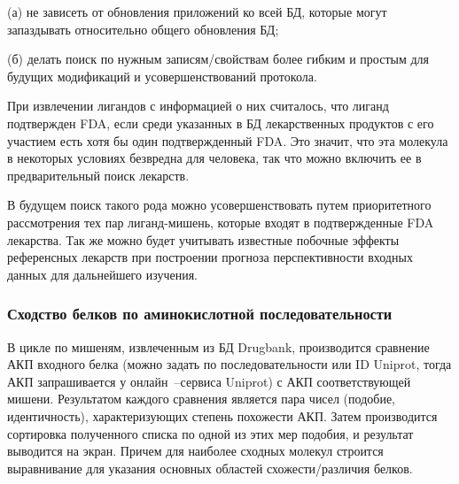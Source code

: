 \documentclass[a4paper,14pt]{article}         %
\begin{document}
(а) не зависеть от обновления приложений ко всей БД, которые могут запаздывать относительно общего обновления БД; 

(б) делать поиск по нужным записям/свойствам более гибким и простым для будущих модификаций и усовершенствований протокола.

При извлечении лигандов с информацией о них считалось, что лиганд подтвержден FDA, если среди указанных в БД лекарственных продуктов с его участием есть хотя бы один подтвержденный FDA. Это значит, что эта молекула в некоторых условиях безвредна для человека, так что можно включить ее в предварительный поиск лекарств. 

В будущем поиск такого рода можно усовершенствовать путем приоритетного рассмотрения тех пар лиганд-мишень, которые входят в подтвержденные FDA лекарства. Так же можно будет учитывать известные побочные эффекты референсных лекарств при построении прогноза перспективности входных данных для дальнейшего изучения.

\subsubsection{Сходство белков по аминокислотной последовательности}

В цикле по мишеням, извлеченным из БД Drugbank, производится сравнение АКП входного белка (можно задать по последовательности или ID Uniprot, тогда АКП запрашивается у онлайн~--сервиса Uniprot) с АКП соответствующей мишени. Результатом каждого сравнения является пара чисел (подобие, идентичность), характеризующих степень похожести АКП. Затем производится сортировка полученного списка по одной из этих мер подобия, и результат выводится на экран. Причем для наиболее сходных молекул строится выравнивание для указания основных областей схожести/различия белков.
\end{document}
